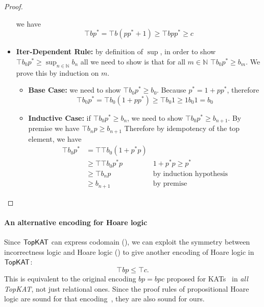 \begin{proof}
\begin{itemize}
            we have 
            \[\top b {p}^* 
            = \top b (p {p}^* + 1)
            \geq \top b p {p}^* \geq c\]
        \item \textbf{Iter-Dependent Rule:}
            by definition of \(\sup\),
            in order to show \(\top b_{0} {p}^* \geq \sup_{n \in ℕ} b_{n}\)
            all we need to show is that for all \(m \in ℕ\)
            \(\top b_{0} {p}^* \geq b_{m}\).
            We prove this by induction on \(m\).
            \begin{itemize}
                \item \textbf{Base Case:}
                    we need to show \(\top b_{0} {p}^* \geq b_{0}\).
                    Because \({p}^* = 1 + p{p}^*\),
                    therefore 
                    \[\top b_{0} {p}^* 
                    = \top b_{0} (1 + p{p}^*)
                    \geq \top b_{0} 1 \geq 1 b_{0} 1 = b_{0}\]
                \item \textbf{Inductive Case:}
                    if \(\top b_{0} {p}^* \geq b_{n}\),
                    we need to show \(\top b_{0} {p}^* \geq b_{n+1}\).
                    By premise we have \(\top b_{n} p \geq b_{n + 1}\)
                    Therefore by idempotency of the top element,
                    we have 
                    \begin{align*}
                        \top b_{0} {p}^* 
                        & = \top \top b_{0} (1 + {p}^* p) \\
                        & \geq \top \top b_{0} {p}^* p
                        & 1 + {p}^* p \geq {p}^* \\
                        & \geq \top b_{n} p
                        & \text{by induction hypothesis} \\
                        & \geq b_{n+1}
                        & \text{by premise}
                    \end{align*}
            \end{itemize}   
    \end{itemize}
\end{proof}

\paragraph*{An alternative encoding for Hoare logic}

Since \(\mathsf{TopKAT}\) can express codomain (), we can exploit the symmetry between incorrectness logic and Hoare
logic () to give another encoding of Hoare
logic in \(\mathsf{TopKAT}\): \[\top b p \leq \top c.\] This is equivalent to the
original encoding $bp = bpc$ proposed for KATs~\cite{Kozen_2000} in \emph{all TopKAT},
not just relational ones.  
Since the proof rules of propositional Hoare logic are sound for that
encoding~\cite[Theorem~3.1]{Kozen_2000}, they are also sound for ours.

